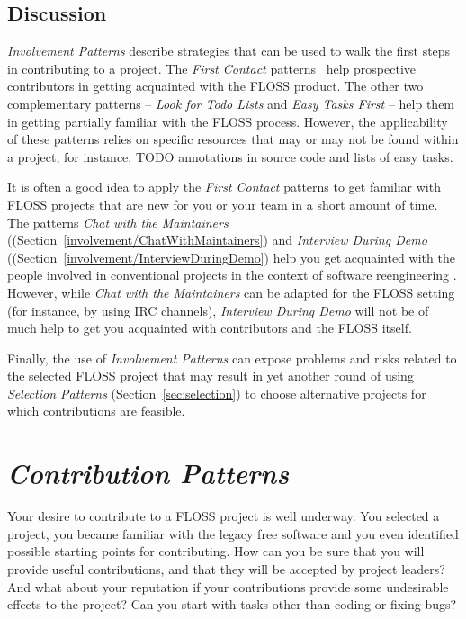 \documentclass[12pt]{article}
\begin{document}
\subsection{Discussion}

\textit{Involvement Patterns} describe strategies that can be used to walk the
first steps in contributing to a project. 
The \textit{First Contact} patterns~\cite{demeyer2008} help
prospective contributors in getting acquainted with the FLOSS product.
The other two complementary patterns --
\textit{Look for Todo Lists} and \textit{Easy Tasks First} 
--  help them in getting partially familiar with the FLOSS process.
However, the applicability of these patterns
relies on specific resources that may or may not be found within a project,
for instance, TODO annotations in source code and lists of easy tasks. 

It is often a good idea to apply the \textit{First Contact} patterns \cite{demeyer2008}
to get familiar with  FLOSS projects that are new for you
or your team in a short amount of time.
%
The patterns  \textit{Chat with the Maintainers} ((Section~\ref{involvement/ChatWithMaintainers}) 
and \textit{Interview During Demo} ((Section~\ref{involvement/InterviewDuringDemo})  
help you get acquainted with the people involved in conventional projects 
in the context of software reengineering \cite{demeyer2008}.
However,  while \textit{Chat with the Maintainers} can be adapted for the FLOSS setting
(for instance, by using IRC channels),
\textit{Interview During Demo} 
will not be of much help to get you  acquainted with contributors and the FLOSS itself.

Finally, the use of \textit{Involvement Patterns} can expose problems and risks 
related to the selected FLOSS project that may
result in yet  another round of using \textit{Selection Patterns} (Section~\ref{sec:selection})
to choose alternative projects for which contributions are feasible.

\section{\textit{Contribution Patterns}} \label{sec:contribution}

Your desire to contribute to a FLOSS project is well underway. 
You selected a project, you became familiar with the legacy free software and 
you even identified possible starting points for contributing.
How can you be sure that you will provide useful contributions, 
and that they will be accepted by project leaders? 
And what about your reputation if your contributions provide some undesirable effects to the project?
Can you start with tasks other than coding or fixing bugs?
\end{document}

